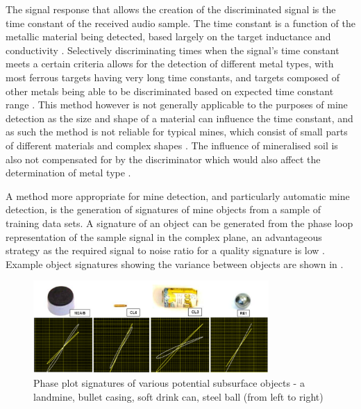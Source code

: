 \documentclass[main.tex]{subfiles}
\begin{document}
The signal response that allows the creation of the discriminated signal is the time constant of the received audio sample. The time constant is a function of the metallic material being detected, based largely on the target inductance and conductivity \parencite{Candy2008}. Selectively discriminating times when the signal's time constant meets a certain criteria allows for the detection of different metal types, with most ferrous targets having very long time constants, and targets composed of other metals being able to be discriminated based on expected time constant range \parencite{Candy2008}. This method however is not generally applicable to the purposes of mine detection as the size and shape of a material can influence the time constant, and as such the method is not reliable for typical mines, which consist of small parts of different materials and complex shapes \parencite{Kruger2006}. The influence of mineralised soil is also not compensated for by the discriminator which would also affect the determination of metal type \parencite{Kruger2006}.

A method more appropriate for mine detection, and particularly automatic mine detection, is the generation of signatures of mine objects from a sample of training data sets. A signature of an object can be generated from the phase loop representation of the sample signal in the complex plane, an advantageous strategy as the required signal to noise ratio for a quality signature is low \parencite{Kruger2006}. Example object signatures showing the variance between objects are shown in .
\begin{figure}[ht]
\includegraphics[width=0.8\textwidth]{2-LiteratureReview/signature.png}
\centering
\caption[Phase plot signatures of various potential subsurface objects]{Phase plot signatures of various potential subsurface objects - a landmine, bullet casing, soft drink can, steel ball (from left to right) \parencite{Kruger2006}} 
\end{figure}
\end{document}
